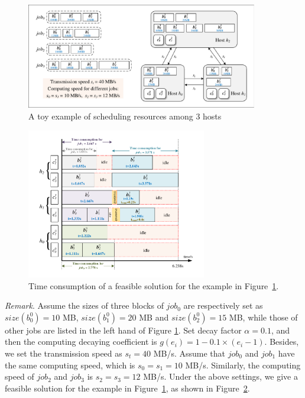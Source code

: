 \documentclass{llncs}
\begin{document}
\begin{figure}[H]
\begin{center}
\includegraphics[width=0.9\textwidth]{Fig-MultiHostExample.pdf}
\caption{A toy example of scheduling resources among 3 hosts}\label{Fig-MultiHostExample}
\end{center}
\end{figure}



\begin{figure}[htbp] 
\begin{center}
\includegraphics[width=0.7\textwidth]{Fig-MultiHostResult.pdf}
\caption{Time consumption of a feasible solution for the example in Figure~\ref{Fig-MultiHostExample}.}
\label{Fig-MultiHostResult}
\end{center}
\end{figure}

\emph{Remark}. Assume the sizes of three blocks of $job_0$ are respectively set as $size(b_0^0)=10$ MB,
$size(b^0_1) = 20$ MB and $size(b^0_2) = 15$ MB, while those of other jobs are listed in the left hand of Figure \ref{Fig-MultiHostExample}. Set decay factor $\alpha = 0.1$, and then the computing decaying coefficient is $g(e_i)=1-0.1\times(e_i-1)$. Besides, we set the transmission speed as $s_t = 40$ MB/s. Assume that $job_0$ and $job_1$ have the same computing speed, which is $s_0 = s_1= 10$ MB/s. Similarly, the computing speed of $job_2$ and $job_3$ is $s_2 = s_3= 12$ MB/s. Under the above settings, we give a feasible solution for the example in Figure~\ref{Fig-MultiHostExample}, as shown in Figure~\ref{Fig-MultiHostResult}.
\end{document}
